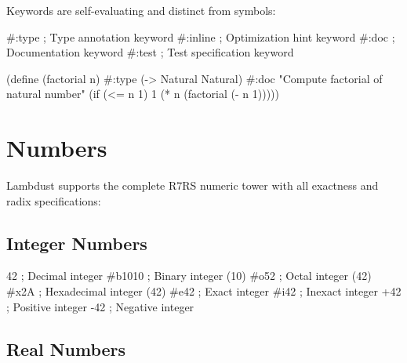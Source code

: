 \begin{grammar}
\end{grammar}

Keywords are self-evaluating and distinct from symbols:

\begin{lambdustcode}
#:type        ; Type annotation keyword
#:inline      ; Optimization hint keyword  
#:doc         ; Documentation keyword
#:test        ; Test specification keyword
\end{lambdustcode}

\begin{example}
\begin{lambdustcode}
(define (factorial n)
  #:type (-> Natural Natural)
  #:doc "Compute factorial of natural number"
  (if (<= n 1) 1 (* n (factorial (- n 1)))))
\end{lambdustcode}
\end{example}

\section{Numbers}
\label{sec:numbers}

Lambdust supports the complete R7RS numeric tower with all exactness and radix specifications:

\begin{grammar}
\end{grammar}

\subsection{Integer Numbers}
\label{subsec:integers}

\begin{lambdustcode}
42          ; Decimal integer
#b1010      ; Binary integer (10)
#o52        ; Octal integer (42)  
#x2A        ; Hexadecimal integer (42)
#e42        ; Exact integer
#i42        ; Inexact integer
+42         ; Positive integer
-42         ; Negative integer
\end{lambdustcode}

\subsection{Real Numbers}
\label{subsec:reals}

